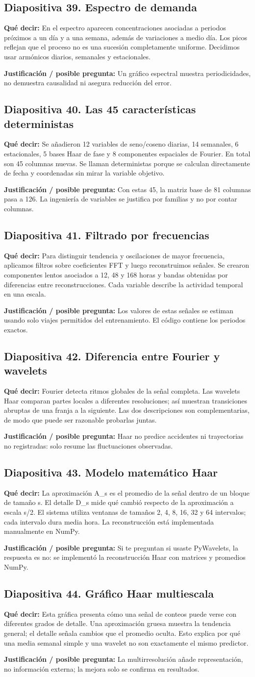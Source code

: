 \documentclass[11pt,letterpaper]{article}
\newcommand{\lamina}[2]{\subsection*{Diapositiva #1. #2}}
\newcommand{\explica}[1]{\noindent\textcolor{azul}{\textbf{Qué decir:}} #1\par\smallskip}
\newcommand{\defiende}[1]{\noindent\textcolor{verde}{\textbf{Justificación / posible pregunta:}} #1\par\medskip}
\begin{document}
\lamina{39}{Espectro de demanda}
\explica{En el espectro aparecen concentraciones asociadas a periodos próximos a un día y a una semana, además de variaciones a medio día. Los picos reflejan que el proceso no es una sucesión completamente uniforme. Decidimos usar armónicos diarios, semanales y estacionales.}
\defiende{Un gráfico espectral muestra periodicidades, no demuestra causalidad ni asegura reducción del error.}

\lamina{40}{Las 45 características deterministas}
\explica{Se añadieron 12 variables de seno/coseno diarias, 14 semanales, 6 estacionales, 5 bases Haar de fase y 8 componentes espaciales de Fourier. En total son 45 columnas nuevas. Se llaman deterministas porque se calculan directamente de fecha y coordenadas sin mirar la variable objetivo.}
\defiende{Con estas 45, la matriz base de 81 columnas pasa a 126. La ingeniería de variables se justifica por familias y no por contar columnas.}

\lamina{41}{Filtrado por frecuencias}
\explica{Para distinguir tendencia y oscilaciones de mayor frecuencia, aplicamos filtros sobre coeficientes FFT y luego reconstruimos señales. Se crearon componentes lentos asociados a 12, 48 y 168 horas y bandas obtenidas por diferencias entre reconstrucciones. Cada variable describe la actividad temporal en una escala.}
\defiende{Los valores de estas señales se estiman usando solo viajes permitidos del entrenamiento. El código contiene los periodos exactos.}

\lamina{42}{Diferencia entre Fourier y wavelets}
\explica{Fourier detecta ritmos globales de la señal completa. Las wavelets Haar comparan partes locales a diferentes resoluciones; así muestran transiciones abruptas de una franja a la siguiente. Las dos descripciones son complementarias, de modo que puede ser razonable probarlas juntas.}
\defiende{Haar no predice accidentes ni trayectorias no registradas: solo resume las fluctuaciones observadas.}

\lamina{43}{Modelo matemático Haar}
\explica{La aproximación A\_s es el promedio de la señal dentro de un bloque de tamaño s. El detalle D\_s mide qué cambió respecto de la aproximación a escala s/2. El sistema utiliza ventanas de tamaños 2, 4, 8, 16, 32 y 64 intervalos; cada intervalo dura media hora. La reconstrucción está implementada manualmente en NumPy.}
\defiende{Si te preguntan si usaste PyWavelets, la respuesta es no: se implementó la reconstrucción Haar con matrices y promedios NumPy.}

\lamina{44}{Gráfico Haar multiescala}
\explica{Esta gráfica presenta cómo una señal de conteos puede verse con diferentes grados de detalle. Una aproximación gruesa muestra la tendencia general; el detalle señala cambios que el promedio oculta. Esto explica por qué una media semanal simple y una wavelet no son exactamente el mismo predictor.}
\defiende{La multirresolución añade representación, no información externa; la mejora solo se confirma en resultados.}
\end{document}
